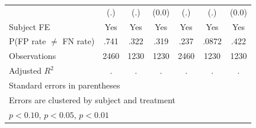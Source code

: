 \begin{table}[htbp]
\begin{tabular}{l*{6}{c}}
                &      (.)         &      (.)         &    (0.0)         &      (.)         &      (.)         &    (0.0)         \\
Subject FE      &      Yes         &      Yes         &      Yes         &      Yes         &      Yes         &      Yes         \\
\hline
P(FP rate $\neq$ FN rate)&     .741         &     .322         &     .319         &     .237         &    .0872         &     .422         \\
Observations    &     2460         &     1230         &     1230         &     2460         &     1230         &     1230         \\
Adjusted \(R^{2}\)&        .         &        .         &        .         &        .         &        .         &        .         \\
\hline\hline
\multicolumn{7}{l}{\footnotesize Standard errors in parentheses}\\
\multicolumn{7}{l}{\footnotesize Errors are clustered by subject and treatment}\\
\multicolumn{7}{l}{\footnotesize \sym{*} \(p<0.10\), \sym{**} \(p<0.05\), \sym{***} \(p<0.01\)}\\
\end{tabular}
\end{table}
